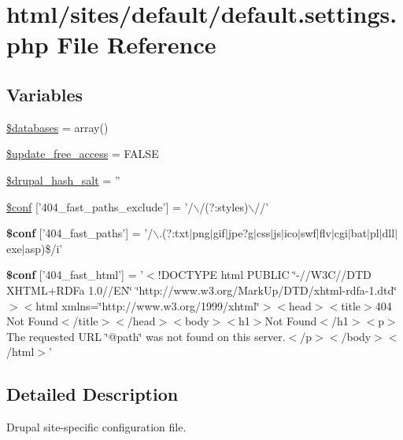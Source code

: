 \hypertarget{default_8settings_8php}{
\section{html/sites/default/default.settings.php File Reference}
\label{default_8settings_8php}
}
\subsection*{Variables}
\begin{DoxyCompactItemize}
\item 
\hyperlink{default_8settings_8php_a97cde67402a68697692531e8b067f86f}{\$databases} = array()
\item 
\hyperlink{default_8settings_8php_afa06f20a6b90dec9a2573e779cd10b44}{\$update\_\-free\_\-access} = FALSE
\item 
\hyperlink{default_8settings_8php_a75c981b07486dd3b07d5f122702dd87e}{\$drupal\_\-hash\_\-salt} = ''
\item 
\hyperlink{default_8settings_8php_ad6ddcdefc93f69592fa04339ffd242c4}{\$conf} \mbox{[}'404\_\-fast\_\-paths\_\-exclude'\mbox{]} = '/$\backslash$/(?:styles)$\backslash$//'
\item 
\hypertarget{default_8settings_8php_ab4cc4748965b0b394129e1559d6ce757}{
{\bfseries \$conf} \mbox{[}'404\_\-fast\_\-paths'\mbox{]} = '/$\backslash$.(?:txt$|$png$|$gif$|$jpe?g$|$css$|$js$|$ico$|$swf$|$flv$|$cgi$|$bat$|$pl$|$dll$|$exe$|$asp)\$/i'}
\label{default_8settings_8php_ab4cc4748965b0b394129e1559d6ce757}

\item 
\hypertarget{default_8settings_8php_a0f8ed56a2a313710a50f04d99d595599}{
{\bfseries \$conf} \mbox{[}'404\_\-fast\_\-html'\mbox{]} = '$<$!DOCTYPE html PUBLIC \char`\"{}-\///W3C//DTD XHTML+RDFa 1.0//EN\char`\"{} \char`\"{}http://www.w3.org/MarkUp/DTD/xhtml-\/rdfa-\/1.dtd\char`\"{}$>$$<$html xmlns=\char`\"{}http://www.w3.org/1999/xhtml\char`\"{}$>$$<$head$>$$<$title$>$404 Not Found$<$/title$>$$<$/head$>$$<$body$>$$<$h1$>$Not Found$<$/h1$>$$<$p$>$The requested URL \char`\"{}@path\char`\"{} was not found on this server.$<$/p$>$$<$/body$>$$<$/html$>$'}
\label{default_8settings_8php_a0f8ed56a2a313710a50f04d99d595599}

\end{DoxyCompactItemize}


\subsection{Detailed Description}
Drupal site-\/specific configuration file.

